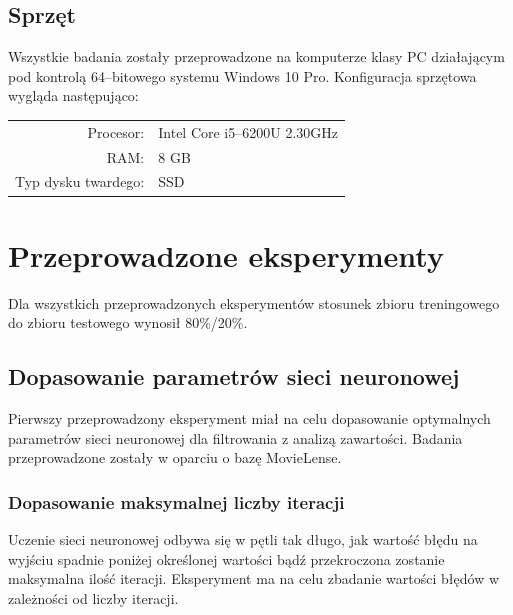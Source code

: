 \documentclass[twoside]{iisthesis}
\begin{document}
		\subsection{Sprzęt}
		
		Wszystkie badania zostały przeprowadzone na komputerze klasy PC działającym pod kontrolą 64--bitowego systemu Windows 10 Pro. Konfiguracja sprzętowa wygląda następująco:
		
		\begin{center}
			\begin{tabular}{ r  l  }
				Procesor: & Intel Core i5--6200U 2.30GHz \\ 
				RAM: & 8 GB \\  
				Typ dysku twardego: & SSD     
			\end{tabular}
		\end{center}
	
	\section{Przeprowadzone eksperymenty}
	
		
		Dla wszystkich przeprowadzonych eksperymentów stosunek zbioru treningowego do zbioru testowego wynosił 80\%/20\%.

		
		\subsection{Dopasowanie parametrów sieci neuronowej}
	
		Pierwszy przeprowadzony eksperyment miał na celu dopasowanie optymalnych parametrów sieci neuronowej dla filtrowania z analizą zawartości. Badania przeprowadzone zostały w oparciu o bazę MovieLense. 
		
		\subsubsection{Dopasowanie maksymalnej liczby iteracji}
		\label{exp:expiterations}
		
			Uczenie sieci neuronowej odbywa się w pętli tak długo, jak wartość błędu na wyjściu spadnie poniżej określonej wartości bądź przekroczona zostanie maksymalna ilość iteracji. Eksperyment ma na celu zbadanie wartości błędów w zależności od liczby iteracji.
				
\end{document}
